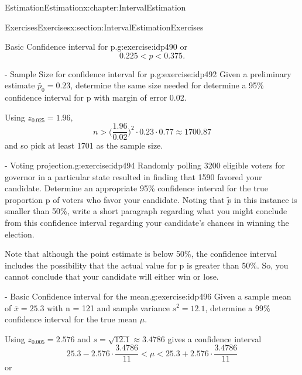 \documentclass[oneside,10pt,]{book}
\numberwithin{equation}{section}
\newcommand{\lt}{<}
\newcommand{\gt}{>}
\begin{document}
\begin{chapterptx}{Estimation}{}{Estimation}{}{}{x:chapter:IntervalEstimation}
\begin{sectionptx}{Exercises}{}{Exercises}{}{}{x:section:IntervalEstimationExercises}
\begin{inlineexercise}{Basic Confidence interval for p.}{g:exercise:idp490}
or%
\begin{equation*}
0.225 \lt p \lt 0.375.
\end{equation*}
%
\end{inlineexercise}%
\begin{inlineexercise}{- Sample Size for confidence interval for p.}{g:exercise:idp492}%
Given a preliminary estimate \(\tilde{p_0} = 0.23\), determine the same size needed for determine a 95\% confidence interval for p with margin of error 0.02.%
\par\smallskip%
\noindent\hypertarget{g:solution:idp493}{}Using \(z_{0.025} = 1.96\),%
\begin{equation*}
n \gt \big ( \frac{1.96}{0.02} \big )^2 \cdot 0.23 \cdot 0.77 \approx 1700.87
\end{equation*}
and so pick at least 1701 as the sample size.%
\end{inlineexercise}%
\begin{inlineexercise}{- Voting projection.}{g:exercise:idp494}%
Randomly polling 3200 eligible voters for governor in a particular state resulted in finding that 1590 favored your candidate. Determine an appropriate 95\% confidence interval for the true proportion p of voters who favor your candidate. Noting that \(\tilde{p}\) in this instance is smaller than 50\%, write a short paragraph regarding what you might conclude from this confidence interval regarding your candidate's chances in winning the election.%
\par\smallskip%
\noindent\hypertarget{g:solution:idp495}{}Note that although the point estimate is below 50\%, the confidence interval includes the possibility that the actual value for p is greater than 50\%. So, you cannot conclude that your candidate will either win or lose.%
\end{inlineexercise}%
\begin{inlineexercise}{- Basic Confidence interval for the mean.}{g:exercise:idp496}%
Given a sample mean of \(\overline{x} = 25.3\) with n = 121 and sample variance \(s^2 = 12.1\), determine a 99\% confidence interval for the true mean \(\mu\).%
\par\smallskip%
\noindent\hypertarget{g:solution:idp497}{}Using \(z_{0.005} = 2.576\) and \(s = \sqrt{12.1} \approx 3.4786\) gives a confidence interval%
\begin{equation*}
25.3 - 2.576 \cdot \frac{3.4786}{11} \lt \mu \lt 25.3 + 2.576 \cdot \frac{3.4786}{11}
\end{equation*}
or%
\begin{equation*}

\end{equation*}
\end{inlineexercise}
\end{sectionptx}
\end{chapterptx}
\end{document}
